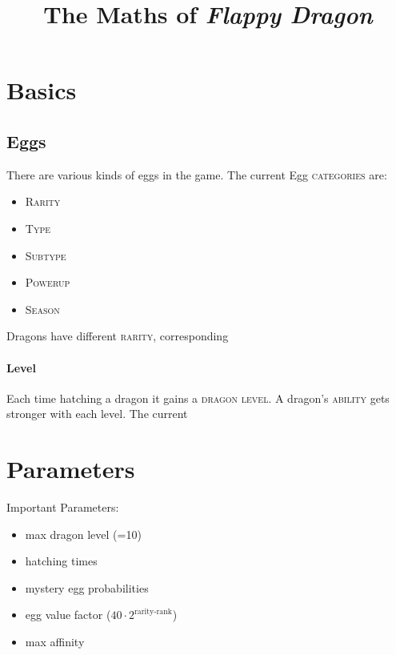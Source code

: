\documentclass[parskip=half]{scrartcl}
\title{The Maths of \emph{Flappy Dragon}}
\newcommand{\definition}[1]{\textsc{#1}}
\begin{document}
\maketitle

\section{Basics}

\subsection{Eggs}
There are various kinds of eggs in the game.
The current Egg \definition{categories} are:
\begin{itemize}
  \item \definition{Rarity}
  \item \definition{Type}
  \item \definition{Subtype}
  \item \definition{Powerup}
  \item \definition{Season}
\end{itemize}

Dragons have different \definition{rarity}, corresponding

\paragraph{Level}
Each time hatching a dragon it gains a \definition{dragon level}.
A dragon's \definition{ability} gets stronger with each level.
The current 



\section{Parameters}
Important Parameters:
\begin{itemize}
\item max dragon level (=10)
\item hatching times
\item mystery egg probabilities
\item egg value factor ($40 \cdot 2^{\textrm{rarity-rank}}$)
\item max affinity
\end{itemize}
\end{document}
